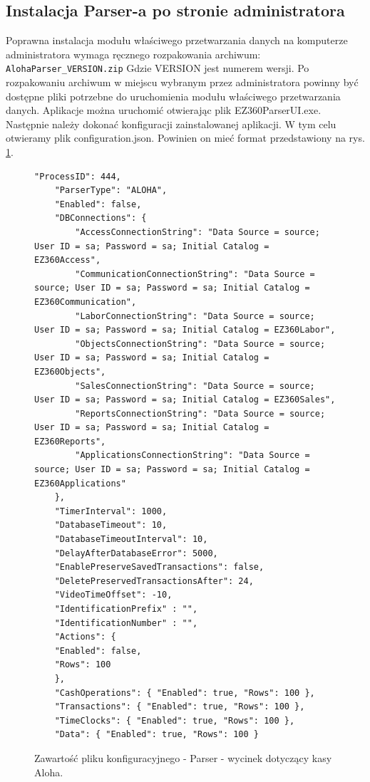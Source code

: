 \documentclass[a4paper]{book}
\begin{document}
\subsection{Instalacja Parser-a po stronie administratora}
Poprawna instalacja modułu właściwego przetwarzania danych na komputerze administratora wymaga ręcznego rozpakowania archiwum:
\newline
 \texttt{AlohaParser\_VERSION.zip}
 \newline
 Gdzie VERSION jest numerem wersji. Po rozpakowaniu archiwum w miejscu wybranym przez administratora powinny być dostępne pliki potrzebne do uruchomienia modułu właściwego przetwarzania danych.
Aplikacje można uruchomić otwierając plik EZ360ParserUI.exe.
Następnie należy dokonać konfiguracji zainstalowanej aplikacji. W tym celu otwieramy plik configuration.json. Powinien on mieć format przedstawiony na rys. \ref{lst:przykladowyPlikKonfiguracyjnyParser}.
\begin{figure}[t]
	\begin{lstlisting}[frame=single, breaklines=true]
	"ProcessID": 444,
	"ParserType": "ALOHA",
	"Enabled": false,
	"DBConnections": {
		"AccessConnectionString": "Data Source = source; User ID = sa; Password = sa; Initial Catalog = EZ360Access",
		"CommunicationConnectionString": "Data Source = source; User ID = sa; Password = sa; Initial Catalog = EZ360Communication",
		"LaborConnectionString": "Data Source = source; User ID = sa; Password = sa; Initial Catalog = EZ360Labor",
		"ObjectsConnectionString": "Data Source = source; User ID = sa; Password = sa; Initial Catalog = EZ360Objects",
		"SalesConnectionString": "Data Source = source; User ID = sa; Password = sa; Initial Catalog = EZ360Sales",
		"ReportsConnectionString": "Data Source = source; User ID = sa; Password = sa; Initial Catalog = EZ360Reports",      
		"ApplicationsConnectionString": "Data Source = source; User ID = sa; Password = sa; Initial Catalog = EZ360Applications"
	},
	"TimerInterval": 1000,
	"DatabaseTimeout": 10,
	"DatabaseTimeoutInterval": 10,
	"DelayAfterDatabaseError": 5000,
	"EnablePreserveSavedTransactions": false,
	"DeletePreservedTransactionsAfter": 24,
	"VideoTimeOffset": -10,
	"IdentificationPrefix" : "",
	"IdentificationNumber" : "",
	"Actions": {
	"Enabled": false,
	"Rows": 100
	},
	"CashOperations": { "Enabled": true, "Rows": 100 },
	"Transactions": { "Enabled": true, "Rows": 100 },
	"TimeClocks": { "Enabled": true, "Rows": 100 },
	"Data": { "Enabled": true, "Rows": 100 }
	\end{lstlisting}
	\caption{Zawartość pliku konfiguracyjnego - Parser - wycinek dotyczący kasy Aloha.}
	\label{lst:przykladowyPlikKonfiguracyjnyParser}
\end{figure}
\end{document}
